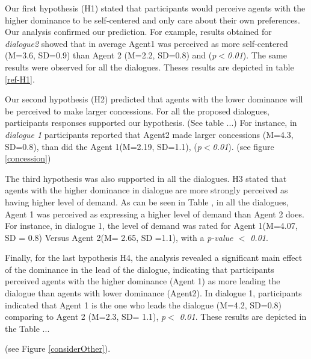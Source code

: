 \documentclass{llncs}
\begin{document}
				\par Our first hypothesis (H1) stated that participants would perceive agents with the higher dominance to be self-centered and only care about their own preferences. Our analysis confirmed our prediction. For example, results obtained for \textit{dialogue2} showed that in average Agent1 was perceived as more self-centered (M=3.6, SD=0.9) than Agent 2 (M=2.2, SD=0.8) and (\textit{p$<$0.01}). The same results were observed for all the dialogues. Theses results are depicted in table \ref{ref-H1}.
				
				\par Our second hypothesis (H2) predicted that agents with the lower dominance will be perceived to make larger concessions. For all the proposed dialogues, participants responses supported our hypothesis. (See table ...)
				For instance, in \textit{dialogue 1} participants reported that Agent2 made larger concessions (M=4.3, SD=0.8), than did the Agent 1(M=2.19, SD=1.1), (\textit{p$<$0.01}).  (see figure  \ref{concession})
				
				\par The third hypothesis was also supported in all the dialogues. H3 stated that agents with the higher dominance in dialogue are more strongly perceived as having higher level of demand. As can be seen in Table , in all the dialogues, Agent 1 was perceived as expressing a higher level of demand than Agent 2 does. For instance, in dialogue 1, the level of demand was rated for Agent 1(M=4.07, SD = 0.8) Versus Agent 2(M= 2.65, SD =1.1), with a \textit{p-value $<$ 0.01}.
				
				\par Finally, for the last hypothesis H4, the analysis revealed a significant main effect of the dominance in the lead of the dialogue, indicating that participants perceived agents with the higher dominance (Agent 1) as more leading the dialogue than agents with lower dominance (Agent2). In dialogue 1, participants indicated that Agent 1 is the one who leads the dialogue (M=4.2, SD=0.8) comparing to Agent 2 (M=2.3, SD= 1.1), \textit{p$<$ 0.01}. These results are depicted in the Table ... 
				
				
				 (see Figure \ref{considerOther}).
							
\end{document}
